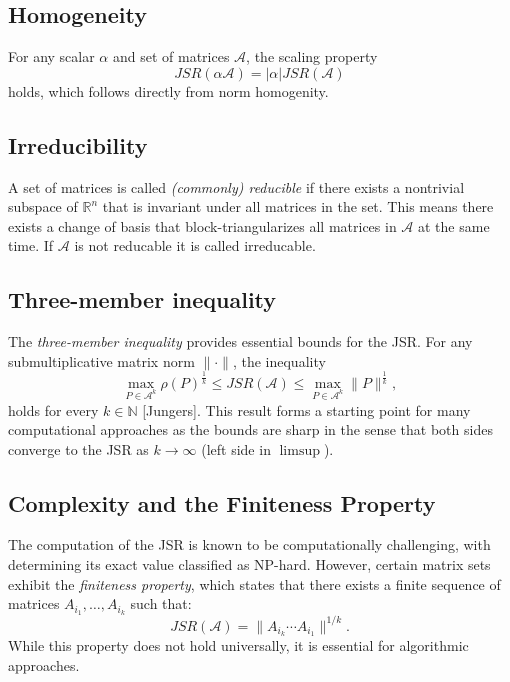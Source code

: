 \subsection*{Homogeneity}
For any scalar $\alpha$ and set of matrices $\mathcal{A}$, the scaling property
\begin{equation}
    JSR(\alpha \mathcal{A}) = |\alpha| JSR(\mathcal{A})
\end{equation}
holds, which follows directly from norm homogenity. 

\subsection*{Irreducibility}
A set of matrices is called \emph{(commonly) reducible} if there exists a nontrivial subspace of $\mathbb{R}^n$ that is invariant under all matrices in the set. This means there exists a change of basis that block-triangularizes all matrices in $\mathcal{A}$ at the same time. If $\mathcal{A}$ is not reducable it is called irreducable. 

\subsection*{Three-member inequality}
The \emph{three-member inequality} provides essential bounds for the JSR. For any submultiplicative matrix norm $\|\cdot\|$, the inequality
\begin{equation}
    \max_{P \in \mathcal{A}^k} \rho(P)^{\frac{1}{k}} \leq JSR(\mathcal{A}) \leq \max_{P \in \mathcal{A}^k} \| P\|^{\frac{1}{k}},
    \label{eq:three-member}
\end{equation}
holds for every $k \in \mathbb{N}$ [Jungers]. This result forms a starting point for many computational approaches as the bounds are sharp in the sense that both sides converge to the JSR as $k\rightarrow \infty$ (left side in $\limsup$).

\subsection*{Complexity and the Finiteness Property}
The computation of the JSR is known to be computationally challenging, with determining its exact value classified as NP-hard. However, certain matrix sets exhibit the \emph{finiteness property}, which states that there exists a finite sequence of matrices $A_{i_1}, \dots, A_{i_k}$ such that:
\begin{equation}
    JSR(\mathcal{A}) = \|A_{i_k} \cdots A_{i_1}\|^{1/k}.
\end{equation}
While this property does not hold universally, it is essential for algorithmic approaches.

